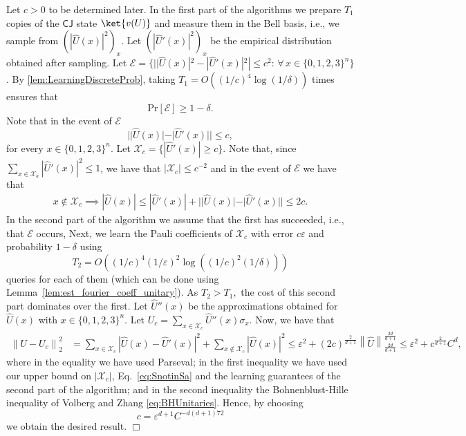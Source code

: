 \documentclass[11pt]{article}
\newcommand{\norm}[1]{\left\|{#1}\right\|}
\newcommand{\eps}{\varepsilon}
\newcommand{\CJ}{\textsf{CJ}}
\theoremstyle{plain}
\theoremstyle{plain}
\theoremstyle{definition}
\theoremstyle{remark}
\renewenvironment{proof}[1][]{
    \begin{trivlist}
    \item[\hspace{\labelsep}{\em\noindent Proof#1:\/}]}
    {{\hfill$\Box$}
    \end{trivlist}
}
\theoremstyle{named}
\begin{document}
\begin{proof}[ of Theorem~\ref{theo:learnunitaries}]
    Let $c>0$ to be determined later. In the first part of the algorithms we prepare $T_1$ copies of the  $\CJ$ state $\ket{v(U)}$ and measure them in the Bell basis, i.e., we sample from $(|\widehat U(x)|^2)_x$. Let  $(|\widehat U'(x)|^2)_{x}$ be the empirical distribution obtained after sampling. Let $\mathcal{E}=\{||\widehat{U}(x)|^2-|\widehat U'(x)|^2|\leq c^2:\, \forall\, x\in\{0,1,2,3\}^n\}$. By \cref{lem:LearningDiscreteProb}, taking $T_1=O((1/c)^4\log(1/\delta))$ times ensures that 
\begin{equation*}
	\mathrm{Pr}[\mathcal{E}]\geq 1- \delta.
\end{equation*}
Note that in the event of $\mathcal{E}$ $$||\widehat{U}(x)|-|\widehat U'(x)||\leq c,$$ for every $x\in\{0,1,2,3\}^n$. Let $\mathcal{X}_c=\{|\widehat U'(x)|\geq c\}$. Note that, since $\sum_{x\in \mathcal X_a}|\widehat U' (x)|^2\leq 1$, we have that $   |\mathcal{X}_c|\leq c^{-2}$ 
and in the event of $\mathcal{E}$ we have that
\begin{align}
    x\notin\mathcal{X}_c\implies |\widehat{U}(x)|\leq |\widehat U'(x)|+||\widehat U(x)|-|\widehat U'(x)||\leq 2c\label{eq:SnotinSa}.
\end{align}
In the second part of the algorithm we assume that the first has succeeded, i.e., that $\mathcal{E}$ occurs, Next, we learn the Pauli coefficients of $\mathcal{X}_c$ with error $c\eps$ and probability $1-\delta $ using $$T_2=O((1/c)^4(1/\eps)^2\log((1/c)^2(1/\delta)))$$ queries for each of them (which can be done using Lemma~\ref{lem:est_fourier_coeff_unitary}). As $T_2>T_1,$ the cost of this second part dominates over the first. Let $\widehat{U}''(x)$ be the approximations obtained for $\widehat U(x)$ with $x\in\{0,1,2,3\}^n$. Let $U_{c}=\sum_{x\in \mathcal{X}_c}\widehat{U}''(x)\sigma_x$. Now, we have that 
\begin{align*}
    \norm{U-U_{c}}_2^2&=\sum_{x\in\mathcal{X}_c}|\widehat U(x)-\widehat{U}'(x)|^2+\sum_{x\notin\mathcal{X}_c} |\widehat U(x)|^2\leq \eps^2+(2c)^{\frac{2}{d+1}}\norm{\widehat U}_{\frac{2d}{d+1}}^{\frac{2d}{d+1}}\leq \eps^2+c^{\frac{2}{d+1}} C^{d},
\end{align*}
where in the equality we have used Parseval; in the first inequality we have used our upper bound on $|\mathcal{X}_c|$, Eq.~\eqref{eq:SnotinSa} and the learning guarantees of the second part of the algorithm; and in the second inequality the Bohnenblust-Hille inequality of Volberg and Zhang \cref{eq:BHUnitaries}. Hence, by choosing $$c=\eps^{d+1}C^{-d(d+1)72}$$ we obtain the desired result.
\end{proof}
\end{document}
